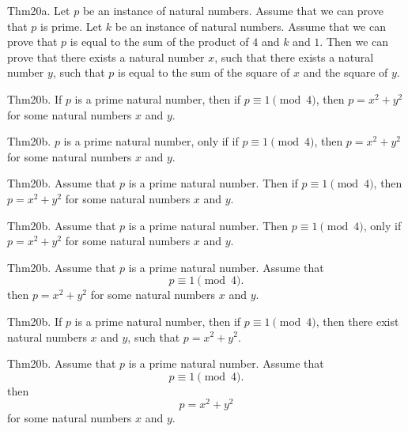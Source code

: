 \documentclass{article}
\begin{document}
Thm20a. Let $p$ be an instance of natural numbers. Assume that we can prove that $p$ is prime. Let $k$ be an instance of natural numbers. Assume that we can prove that $p$ is equal to the sum of the product of $4$ and $k$ and $1$. Then we can prove that there exists a natural number $x$, such that there exists a natural number $y$, such that $p$ is equal to the sum of the square of $x$ and the square of $y$.

Thm20b. If $p$ is a prime natural number, then if $p \equiv 1 \pmod{ 4}$, then $p = x ^{ 2}+ y ^{ 2}$ for some natural numbers $x$ and $y$.

Thm20b. $p$ is a prime natural number, only if if $p \equiv 1 \pmod{ 4}$, then $p = x ^{ 2}+ y ^{ 2}$ for some natural numbers $x$ and $y$.

Thm20b. Assume that $p$ is a prime natural number. Then if $p \equiv 1 \pmod{ 4}$, then $p = x ^{ 2}+ y ^{ 2}$ for some natural numbers $x$ and $y$.

Thm20b. Assume that $p$ is a prime natural number. Then $p \equiv 1 \pmod{ 4}$, only if $p = x ^{ 2}+ y ^{ 2}$ for some natural numbers $x$ and $y$.

Thm20b. Assume that $p$ is a prime natural number. Assume that $$p \equiv 1 \pmod{ 4}.$$ then $p = x ^{ 2}+ y ^{ 2}$ for some natural numbers $x$ and $y$.

Thm20b. If $p$ is a prime natural number, then if $p \equiv 1 \pmod{ 4}$, then there exist natural numbers $x$ and $y$, such that $p = x ^{ 2}+ y ^{ 2}$.

Thm20b. Assume that $p$ is a prime natural number. Assume that $$p \equiv 1 \pmod{ 4}.$$ then $$p = x ^{ 2}+ y ^{ 2}$$ for some natural numbers $x$ and $y$.
\end{document}

